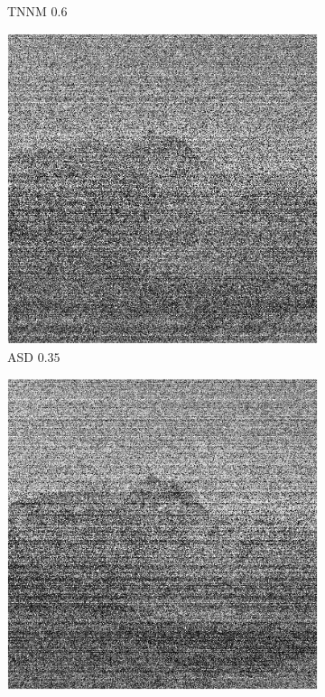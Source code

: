 \begin{figure}[!ht]
\begin{subfigure}{0.325\linewidth}
        \caption{TNNM $0.6$}
    \end{subfigure}
    \begin{subfigure}{0.325\linewidth}
        \includegraphics[width=\linewidth]{Poglavja/Slike/grayscale1000/slikaRez35ASD400.png}
        \caption{ASD $0.35$}
    \end{subfigure}
    \hfill
    \begin{subfigure}{0.325\linewidth}
        \includegraphics[width=\linewidth]{Poglavja/Slike/grayscale1000/slikaRez45ASD600.png}

\end{subfigure}
\end{figure}
